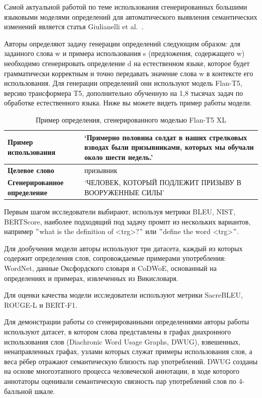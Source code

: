 \documentclass[LI,VKR]{HSEUniversity}
\begin{document}
Самой актуальной работой по теме использования сгенерированных большими языковыми моделями
определений для автоматического выявления семантических изменений является статья
Giulianelli et al.~\cite{DefinitionGenerationMainArticle}.

Авторы определяют задачу генерации определений следующим образом: для заданного слова w и примера
использования s (предложения, содержащего w) необходимо сгенерировать определение d на
естественном языке, которое будет грамматически корректным и точно передавать значение слова
w в контексте его использования.
Для генерации определений они используют модель Flan-T5, версию трансформера T5,
дополнительно обученную на 1,8 тысячах задач по обработке естественного языка.
Ниже вы можете видеть пример работы модели.

\begin{table}[H]
\centering
\caption{Пример определения, сгенерированного моделью Flan-T5 XL}
\begin{tabular}{|l|p{8cm}|}
\hline
\textbf{Пример использования} & ‘Примерно половина солдат в наших стрелковых взводах были призывниками, которых мы обучали около шести недель.’ \\
\hline
\textbf{Целевое слово} & призывник \\
\hline
\textbf{Сгенерированное определение} & ‘ЧЕЛОВЕК, КОТОРЫЙ ПОДЛЕЖИТ ПРИЗЫВУ В ВООРУЖЕННЫЕ СИЛЫ’ \\
\hline
\end{tabular}
\end{table}

Первым шагом исследователи выбирают, используя метрики BLEU, NIST, BERTScore, наиболее
подходящий под задачу промпт из нескольких вариантов, например
\("\)what is the definition of <trg>?\("\) или \("\)define the word <trg>\("\).

Для дообучения модели авторы используют три датасета, каждый из которых содержит определения
слов, сопровождаемые примерами употребления: WordNet, данные Оксфордского словаря и CoDWoE,
основанный на определениях и примерах, извлеченных из Викисловаря.

Для оценки качества модели исследователи используют метрики SacreBLEU, ROUGE-L и BERT-F1.

Для демонстрации работы со сгенерированными определениями авторы
работы используют датасет, в котором слова представлены в графах диахронного использования
слов (Diachronic Word Usage Graphs, DWUG), взвешенных, ненаправленных графах,
узлами которых служат примеры использования слов, а веса рёбер отражают семантическую
близость пар употреблений.
DWUG созданы на основе многоэтапного процесса человеческой аннотации, в ходе которого аннотаторы
оценивали семантическую связность пар употреблений слов по 4-балльной шкале.
\end{document}
